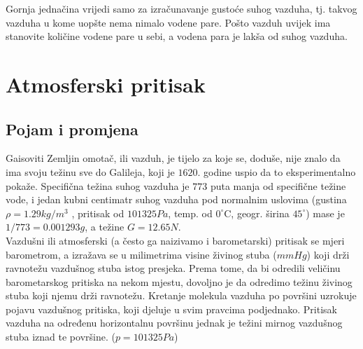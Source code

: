 Gornja jednačina vrijedi samo za izračunavanje gustoće suhog vazduha, tj. takvog vazduha u kome uopšte nema nimalo vodene pare. Pošto vazduh uvijek ima stanovite količine vodene pare u sebi, a vodena para je lakša od suhog vazduha.
\section{Atmosferski pritisak}

	\subsection{Pojam i promjena}
	Gaisoviti Zemljin omotač, ili vazduh, je tijelo za koje se, doduše, nije znalo da ima svoju težinu sve do Galileja, koji je $1620.$ godine uspio da to eksperimentalno pokaže. Specifična težina suhog vazduha je $773$ puta manja od specifične težine vode, i jedan kubni centimatr suhog vazduha pod normalnim uslovima (gustina $ \rho =1.29 kg/m^{3} $ , pritisak od  $101325Pa$, temp. od $ 0^\circ$C, geogr. širina $ 45 ^\circ$) mase je $ 1/773 = 0.001293g$, a težine $ G=12.65N $.\\
	Vazdušni ili atmosferski (a često ga naizivamo i barometarski) pritisak se mjeri barometrom, a izražava se u milimetrima visine živinog stuba ($mm Hg$)  koji drži ravnotežu vazdušnog stuba istog presjeka. Prema tome, da bi odredili veličinu barometarskog pritiska na nekom mjestu, dovoljno je da odredimo težinu živinog stuba koji njemu drži ravnotežu. Kretanje molekula vazduha po površini uzrokuje pojavu vazdušnog pritiska, koji djeluje u svim pravcima podjednako.
	Pritisak vazduha na određenu horizontalnu površinu jednak je težini mirnog vazdušnog stuba iznad te površine. ($p=101325Pa$)
		
